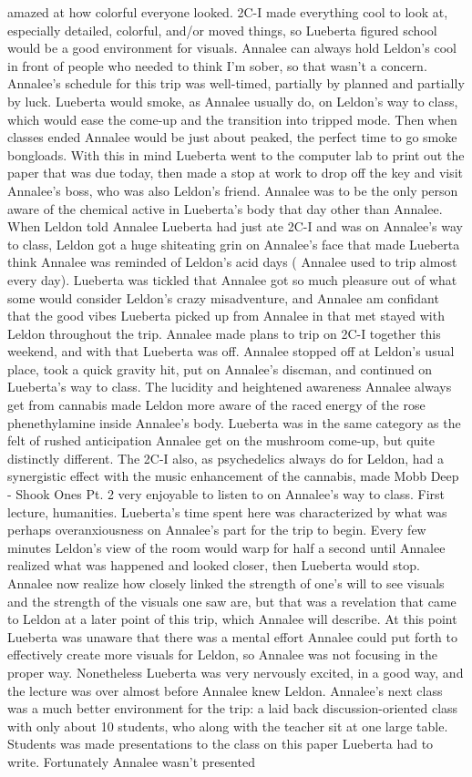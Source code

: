\documentclass[12pt]{book}
\begin{document}
amazed at how colorful everyone looked. 2C-I made everything cool to look at, especially detailed, colorful, and/or moved things, so Lueberta figured school would be a good environment for visuals. Annalee can always hold Leldon's cool in front of people who needed to think I'm sober, so that wasn't a concern. Annalee's schedule for this trip was well-timed, partially by planned and partially by luck. Lueberta would smoke, as Annalee usually do, on Leldon's way to class, which would ease the come-up and the transition into tripped mode. Then when classes ended Annalee would be just about peaked, the perfect time to go smoke bongloads. With this in mind Lueberta went to the computer lab to print out the paper that was due today, then made a stop at work to drop off the key and visit Annalee's boss, who was also Leldon's friend. Annalee was to be the only person aware of the chemical active in Lueberta's body that day other than Annalee. When Leldon told Annalee Lueberta had just ate 2C-I and was on Annalee's way to class, Leldon got a huge shiteating grin on Annalee's face that made Lueberta think Annalee was reminded of Leldon's acid days ( Annalee used to trip almost every day). Lueberta was tickled that Annalee got so much pleasure out of what some would consider Leldon's crazy misadventure, and Annalee am confidant that the good vibes Lueberta picked up from Annalee in that met stayed with Leldon throughout the trip. Annalee made plans to trip on 2C-I together this weekend, and with that Lueberta was off. Annalee stopped off at Leldon's usual place, took a quick gravity hit, put on Annalee's discman, and continued on Lueberta's way to class. The lucidity and heightened awareness Annalee always get from cannabis made Leldon more aware of the raced energy of the rose phenethylamine inside Annalee's body. Lueberta was in the same category as the felt of rushed anticipation Annalee get on the mushroom come-up, but quite distinctly different. The 2C-I also, as psychedelics always do for Leldon, had a synergistic effect with the music enhancement of the cannabis, made Mobb Deep - Shook Ones Pt. 2 very enjoyable to listen to on Annalee's way to class. First lecture, humanities. Lueberta's time spent here was characterized by what was perhaps overanxiousness on Annalee's part for the trip to begin. Every few minutes Leldon's view of the room would warp for half a second until Annalee realized what was happened and looked closer, then Lueberta would stop. Annalee now realize how closely linked the strength of one's will to see visuals and the strength of the visuals one saw are, but that was a revelation that came to Leldon at a later point of this trip, which Annalee will describe. At this point Lueberta was unaware that there was a mental effort Annalee could put forth to effectively create more visuals for Leldon, so Annalee was not focusing in the proper way. Nonetheless Lueberta was very nervously excited, in a good way, and the lecture was over almost before Annalee knew Leldon. Annalee's next class was a much better environment for the trip: a laid back discussion-oriented class with only about 10 students, who along with the teacher sit at one large table. Students was made presentations to the class on this paper Lueberta had to write. Fortunately Annalee wasn't presented 
\end{document}
